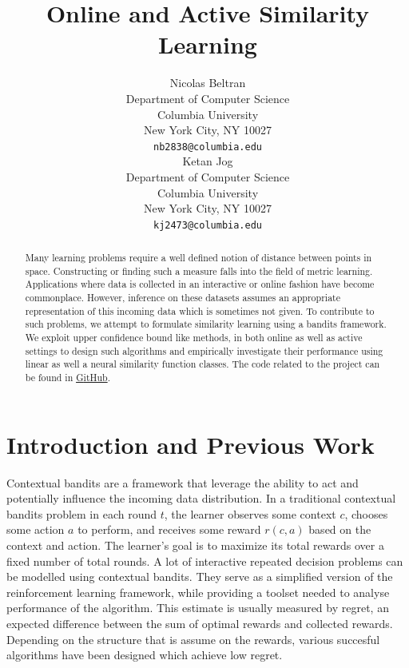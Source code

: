 \documentclass{article}
\title{Online and Active Similarity Learning}
\author{
  Nicolas Beltran\\
  Department of Computer Science\\
  Columbia University\\
  New York City, NY 10027 \\
  \texttt{nb2838@columbia.edu}\\
  \And
  Ketan Jog\\
  Department of Computer Science\\
  Columbia University\\
  New York City, NY 10027 \\
  \texttt{kj2473@columbia.edu}\\
}
\newcommand{\myul}[2][black]{\setulcolor{#1}\ul{#2}\setulcolor{black}}
\begin{document}
\maketitle

\begin{abstract}
    Many learning problems require a well defined notion of distance between points in space.
    Constructing or finding such a measure falls into the field of metric learning.
    Applications where data is collected in an interactive or online fashion have become commonplace.
    However, inference on these datasets assumes an appropriate representation of this incoming data which is sometimes not given.
    To contribute to such problems, we attempt to formulate similarity learning using a bandits framework.
    We exploit upper confidence bound like methods, in both online as well as active settings to design such algorithms
    and empirically investigate their performance using linear as well a neural similarity function classes.
    The code related to the project can be found in \href{https://github.com/velezbeltran/metric-bandits}{\color{blue} \myul[blue] GitHub}.
\end{abstract}


\section{Introduction and Previous Work}
Contextual bandits are a framework that leverage the ability to act and potentially influence the incoming data distribution.
In a traditional contextual bandits problem in each round $t$, the learner observes some context $c$, chooses some action $a$ to perform, and receives some reward $r(c,a)$ based on the context and action.
The learner's goal is to maximize its total rewards over a fixed number of total rounds.
A lot of interactive repeated decision problems can be modelled using contextual bandits.
They serve as a simplified version of the reinforcement learning framework, while providing a toolset needed to analyse performance of the algorithm.
This estimate is usually measured by regret, an expected difference between the sum of optimal rewards and collected rewards.
Depending on the structure that is assume on the rewards, various succesful algorithms have been designed which achieve low regret.\cite{bandit-algorithms}
\end{document}

